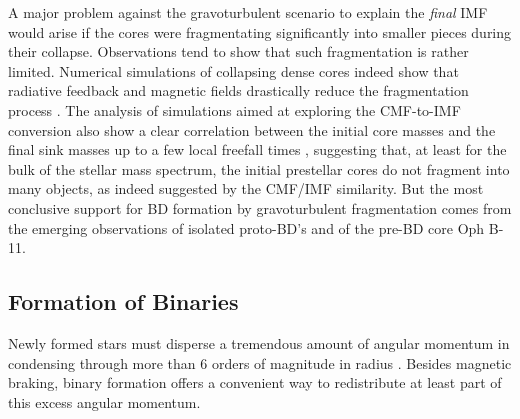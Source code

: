 A major problem against the gravoturbulent scenario to explain the {\it final} IMF would arise if the cores were fragmentating significantly into smaller pieces during their collapse. Observations tend to show that
such fragmentation is rather limited. Numerical simulations of collapsing dense cores indeed show that radiative feedback and magnetic fields drastically reduce the fragmentation process \citep[e.g.][] {Krumholz2007, Offner2009, Commercon2010, Commercon2011, Hennebelle2011b,Seifried2013}. 
The analysis of simulations aimed at exploring the CMF-to-IMF conversion \citep{Smith2009} also show a clear correlation between the initial core masses and the final sink masses up to a few local freefall times \citep{Chabrier2010}, suggesting that, at least for the
bulk of the stellar mass spectrum, the initial prestellar cores do not fragment into many objects, as indeed suggested by the CMF/IMF similarity. But the most conclusive support for BD formation by gravoturbulent fragmentation comes from the emerging observations of isolated proto-BD's and of the pre-BD core Oph B-11\citep{Chabrier2014}.

\subsection{Formation of Binaries}
\label{bin_fn}

Newly formed stars must disperse a tremendous amount of angular momentum in condensing through more than 6 orders of magnitude in radius \citep{Bodenheimer1995}. Besides magnetic braking, binary formation offers a  convenient way
to redistribute at least part of this excess angular momentum. 

